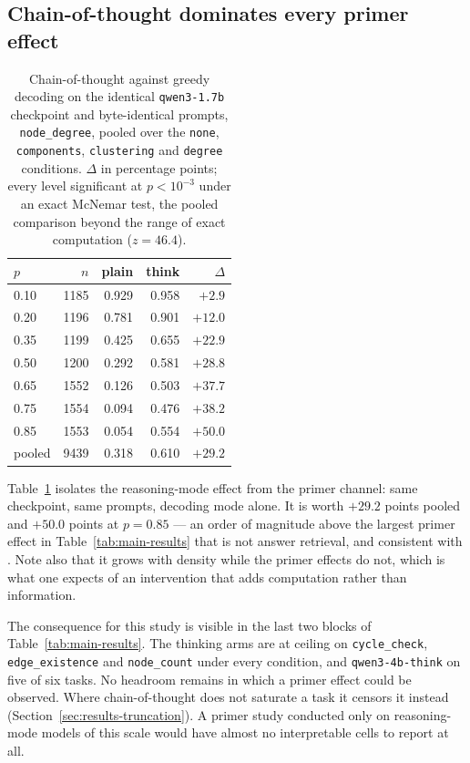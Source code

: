 \documentclass[11pt]{article}
\begin{document}
\subsection{Chain-of-thought dominates every primer effect}
\label{sec:results-cot}

\begin{table}[t]
\centering
\small
\begin{tabular}{lrrrr}
\toprule
$p$ & $n$ & plain & think & $\Delta$ \\
\midrule
0.10 & 1185 & 0.929 & 0.958 & $+2.9$ \\
0.20 & 1196 & 0.781 & 0.901 & $+12.0$ \\
0.35 & 1199 & 0.425 & 0.655 & $+22.9$ \\
0.50 & 1200 & 0.292 & 0.581 & $+28.8$ \\
0.65 & 1552 & 0.126 & 0.503 & $+37.7$ \\
0.75 & 1554 & 0.094 & 0.476 & $+38.2$ \\
0.85 & 1553 & 0.054 & 0.554 & $+50.0$ \\
\midrule
pooled & 9439 & 0.318 & 0.610 & $+29.2$ \\
\bottomrule
\end{tabular}
\caption{Chain-of-thought against greedy decoding on the identical
\texttt{qwen3-1.7b} checkpoint and byte-identical prompts,
\texttt{node\_degree}, pooled over the \texttt{none}, \texttt{components},
\texttt{clustering} and \texttt{degree} conditions. $\Delta$ in percentage
points; every level significant at $p < 10^{-3}$ under an exact McNemar
test, the pooled comparison beyond the range of exact computation
($z = 46.4$).}
\label{tab:cot}
\end{table}

Table~\ref{tab:cot} isolates the reasoning-mode effect from the primer
channel: same checkpoint, same prompts, decoding mode alone. It is worth
$+29.2$ points pooled and $+50.0$ points at $p = 0.85$ --- an order of
magnitude above the largest primer effect in Table~\ref{tab:main-results}
that is not answer retrieval, and consistent with
\citet{wei2022chainofthought}. Note also that it grows with density while
the primer effects do not, which is what one expects of an intervention
that adds computation rather than information.

The consequence for this study is visible in the last two blocks of
Table~\ref{tab:main-results}. The thinking arms are at ceiling on
\texttt{cycle\_check}, \texttt{edge\_existence} and \texttt{node\_count}
under every condition, and \texttt{qwen3-4b-think} on five of six tasks.
No headroom remains in which a primer effect could be observed.
Where chain-of-thought does not saturate a task it censors it instead
(Section~\ref{sec:results-truncation}). A primer study conducted only on
reasoning-mode models of this scale would have almost no interpretable
cells to report at all.
\end{document}
